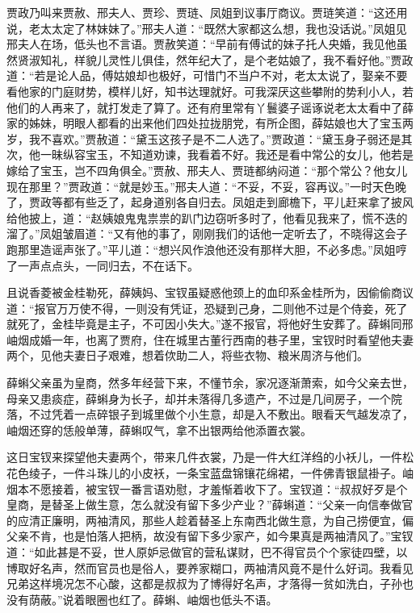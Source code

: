 \documentclass[12pt,oneside]{book}
\begin{document}
贾政乃叫来贾赦、邢夫人、贾珍、贾琏、凤姐到议事厅商议。贾琏笑道：“这还用说，老太太定了林妹妹了。”邢夫人道：“既然大家都这么想，我也没话说。”凤姐见邢夫人在场，低头也不言语。贾赦笑道：“早前有傅试的妹子托人央婚，我见他虽然贤淑知礼，样貌儿灵性儿俱佳，然年纪大了，是个老姑娘了，我不看好他。”贾政道：“若是论人品，傅姑娘却也极好，可惜门不当户不对，老太太说了，娶亲不要看他家的门庭财势，模样儿好，知书达理就好。可我深厌这些攀附的势利小人，若他们的人再来了，就打发走了算了。还有府里常有丫鬟婆子谣诼说老太太看中了薛家的姊妹，明眼人都看的出来他们四处拉拢朋党，有所企图，薛姑娘也大了宝玉两岁，我不喜欢。”贾赦道：“黛玉这孩子是不二人选了。”贾政道：“黛玉身子弱还是其次，他一昧纵容宝玉，不知道劝谏，我看着不好。我还是看中常公的女儿，他若是嫁给了宝玉，岂不四角俱全。”贾赦、邢夫人、贾琏都纳闷道：“那个常公？他女儿现在那里？”贾政道：“就是妙玉。”邢夫人道：“不妥，不妥，容再议。”一时天色晚了，贾政等都有些乏了，起身道别各自归去。凤姐走到廊檐下，平儿赶来拿了披风给他披上，道：“赵姨娘鬼鬼祟祟的趴门边窃听多时了，他看见我来了，慌不迭的溜了。”凤姐皱眉道：“又有他的事了，刚刚我们的话他一定听去了，不晓得这会子跑那里造谣声张了。”平儿道：“想兴风作浪他还没有那样大胆，不必多虑。”凤姐哼了一声点点头，一同归去，不在话下。

且说香菱被金桂勒死，薛姨妈、宝钗虽疑惑他颈上的血印系金桂所为，因偷偷商议道：“报官万万使不得，一则没有凭证，恐疑到己身，二则他不过是个侍妾，死了就死了，金桂毕竟是主子，不可因小失大。”遂不报官，将他好生安葬了。薛蝌同邢岫烟成婚一年，也离了贾府，住在城里古董行西南的巷子里，宝钗时时看望他夫妻两个，见他夫妻日子艰难，想着佽助二人，将些衣物、粮米周济与他们。

薛蝌父亲虽为皇商，然多年经营下来，不懂节余，家况逐渐萧索，如今父亲去世，母亲又患痰症，薛蝌身为长子，却并未落得几多遗产，不过是几间房子，一个院落，不过凭着一点碎银子到城里做个小生意，却是入不敷出。眼看天气越发凉了，岫烟还穿的恁般单薄，薛蝌叹气，拿不出银两给他添置衣裳。

这日宝钗来探望他夫妻两个，带来几件衣裳，乃是一件大红洋绉的小袄儿，一件松花色绫子，一件斗珠儿的小皮袄，一条宝蓝盘锦镶花绵裙，一件佛青银鼠褂子。岫烟本不愿接着，被宝钗一番言语劝慰，才羞惭着收下了。宝钗道：“叔叔好歹是个皇商，是替圣上做生意，怎么就没有留下多少产业？”薛蝌道：“父亲一向信奉做官的应清正廉明，两袖清风，那些人趁着替圣上东南西北做生意，为自己捞便宜，偏父亲不肯，也是怕落人把柄，故没有留下多少家产，如今果真是两袖清风了。”宝钗道：“如此甚是不妥，世人原妒忌做官的营私谋财，巴不得官员个个家徒四壁，以博取好名声，然而官员也是俗人，要养家糊口，两袖清风竟不是什么好词。我看见兄弟这样境况怎不心酸，这都是叔叔为了博得好名声，才落得一贫如洗白，子孙也没有荫蔽。”说着眼圈也红了。薛蝌、岫烟也低头不语。
\end{document}
